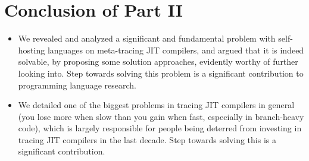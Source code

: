 \chapter{Conclusion of Part II}

	\begin{mainpoint}

		\begin{itemize}
			\item We revealed and analyzed a significant and fundamental problem with 
		self-hosting languages on meta-tracing JIT compilers, and argued that
		it is indeed solvable, by proposing some solution approaches, evidently
		worthy of further looking into. 
		Step towards solving this problem is a significant contribution to 
		programming language research.
			\item We detailed one of the biggest problems in tracing JIT compilers in general
		(you lose more when slow than you gain when fast, especially in branch-heavy code), 
		which is largely responsible for people being deterred from
		investing in tracing JIT compilers in the last decade. Step
		towards solving this is a significant contribution.
		\end{itemize}
		
	\end{mainpoint}